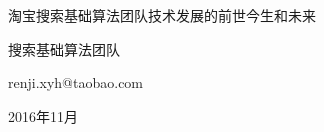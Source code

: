  \vspace*{0.0cm}
\thispagestyle{empty}
\vspace*{2.2cm}
\centerline{\hei{\color{darkblue}{第一版前言}}}\vspace{2cm}

淘宝搜索基础算法团队技术发展的前世今生和未来



\vspace{1cm}

\hfill 搜索基础算法团队 \hspace{0.2em}

\hfill renji.xyh@taobao.com \hspace{0.2em}

\hfill 2016年11月\hspace{0.2em}
